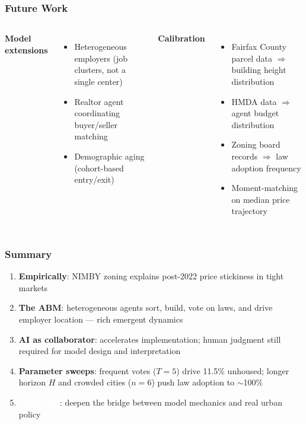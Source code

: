 \documentclass{beamer}
\begin{document}
\begin{frame}
  \frametitle{Future Work}
  \begin{columns}
    \textbf{Model extensions}
    \begin{itemize}
      \small
      \item Heterogeneous employers (job clusters, not a single center)
      \item Realtor agent coordinating buyer/seller matching
      \item Demographic aging (cohort-based entry/exit)
    \end{itemize}
    \textbf{Calibration}
    \begin{itemize}
      \small
      \item Fairfax County parcel data $\Rightarrow$ building height distribution
      \item HMDA data $\Rightarrow$ agent budget distribution
      \item Zoning board records $\Rightarrow$ law adoption frequency
      \item Moment-matching on median price trajectory
    \end{itemize}
  \end{columns}
\end{frame}


\begin{frame}
  \frametitle{Summary}
  \begin{enumerate}
    \item \textcolor{nimbyblue}{\textbf{Empirically}}: NIMBY zoning explains post-2022 price stickiness in tight markets
    \item \textcolor{nimbygreen}{\textbf{The ABM}}: heterogeneous agents sort, build, vote on laws, and drive employer location — rich emergent dynamics
    \item \textcolor{nimbyyellow}{\textbf{AI as collaborator}}: accelerates implementation; human judgment still required for model design and interpretation
    \item \textcolor{nimbyred}{\textbf{Parameter sweeps}}: frequent votes ($T=5$) drive 11.5\% unhoused; longer horizon $H$ and crowded cities ($n=6$) push law adoption to $\sim$100\%
    \item \textcolor{white}{\textbf{Next step}}: deepen the bridge between model mechanics and real urban policy
  \end{enumerate}
\end{frame}
\end{document}
